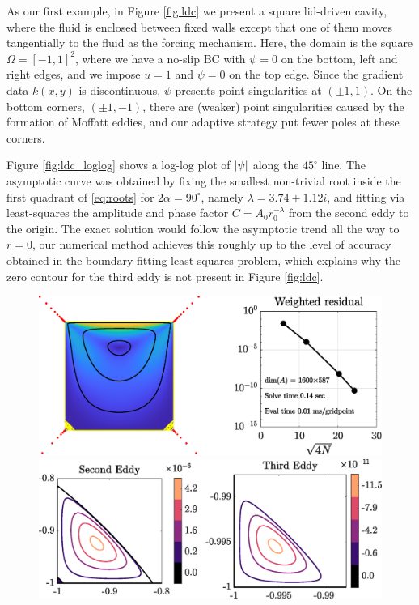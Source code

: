 \documentclass{article}
\begin{document}
\begin{example}
\label{ex:square}
As our first example, in Figure \ref{fig:ldc} we present a square lid-driven
cavity, where the fluid is enclosed between fixed walls except that one of
them moves tangentially to the fluid as the forcing mechanism. Here, the
domain is the square $\Omega=[-1,1]^2$, where we have a no-slip BC with
$\psi=0$ on the bottom, left and right edges, and we impose $u=1$ and
$\psi=0$ on the top edge. Since the gradient data $k(x,y)$ is discontinuous,
$\psi$ presents point singularities at $(\pm 1, 1)$. On the bottom corners,
$(\pm 1,-1)$, there are (weaker) point singularities caused by the formation
of Moffatt eddies, and our adaptive strategy put fewer poles at these
corners.

Figure \ref{fig:ldc_loglog} shows a log-log plot of $\abs{\psi}$ along the
$45^\circ$ line. The asymptotic curve was obtained by fixing the smallest
non-trivial root inside the first quadrant of \eqref{eq:roots} for
$2\alpha=90^\circ$, namely $\lambda=3.74 + 1.12i$, and fitting via
least-squares the amplitude and phase factor $C = A_0 r_0^{-\lambda}$ from
the second eddy to the origin.  The exact solution would follow the
asymptotic trend all the way to $r=0$, our numerical method achieves this
roughly up to the level of accuracy obtained in the boundary fitting
least-squares problem, which explains why the zero contour for the third
eddy is not present in Figure \ref{fig:ldc}. 
\begin{figure}[H]
\centering
\includegraphics[width=\linewidth]{Figures/ldc}

\vspace{2em}
\includegraphics[width=\linewidth]{Figures/ldc_eddy}


\end{figure}
\end{example}
\end{document}
